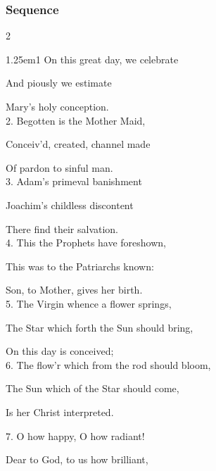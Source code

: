 
\subsubsection{Sequence}
\begin{multicols}{2}
\begin{hangparas}{1.25em}{1}
On this great day, we celebrate

And piously we estimate

Mary's holy conception.\\

2. Begotten is the Mother Maid,

Conceiv'd, created, channel made

Of pardon to sinful man.\\

3. Adam's primeval banishment

Joachim's childless discontent

There find their salvation.\\

4. This the Prophets have foreshown,

This was to the Patriarchs known:

Son, to Mother, gives her birth.\\

5. The Virgin whence a flower springs,

The Star which forth the Sun should bring,

On this day is conceived;\\

6. The flow'r which from the rod should bloom,

The Sun which of the Star should come,

Is her Christ interpreted.%

7. O how happy, O how radiant!

Dear to God, to us how brilliant,


\end{hangparas}
\end{multicols}
